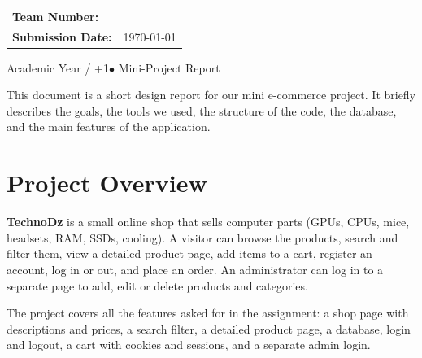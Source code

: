 \documentclass[11pt,a4paper]{article}
\begin{document}
\vspace{1.5cm}

\begin{center}
    \begin{tabular}{ll}
        \textbf{\color{branddark}Team Number:} & \underline{\hspace{4cm}} \\[0.6em]
        \textbf{\color{branddark}Submission Date:} & \today \\
    \end{tabular}
\end{center}

\vfill

\noindent\colorbox{branddark}{%
    \begin{minipage}[t][1.2cm][c]{\dimexpr\textwidth-2\fboxsep\relax}
        \centering
        {\color{white}\small Academic Year \the\year{} / \the\numexpr\year+1\relax \quad $\bullet$ \quad Mini-Project Report}
    \end{minipage}%
}

\newpage

\setcounter{page}{1}

\begin{infobox}
This document is a short design report for our mini e-commerce project.
It briefly describes the goals, the tools we used, the structure of the
code, the database, and the main features of the application.
\end{infobox}

\section{Project Overview}

\textbf{TechnoDz} is a small online shop that sells computer parts (GPUs,
CPUs, mice, headsets, RAM, SSDs, cooling). A visitor can browse the
products, search and filter them, view a detailed product page, add items
to a cart, register an account, log in or out, and place an order. An
administrator can log in to a separate page to add, edit or delete
products and categories.

The project covers all the features asked for in the assignment: a shop
page with descriptions and prices, a search filter, a detailed product
page, a database, login and logout, a cart with cookies and sessions, and
a separate admin login.
\end{document}
